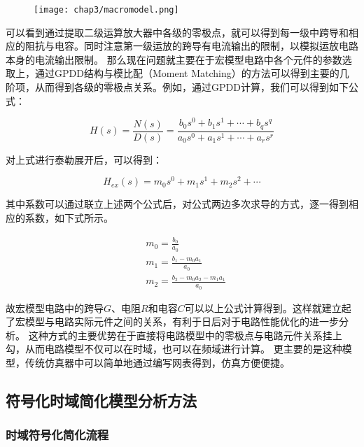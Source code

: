 \begin{figure}[!htp]
	\centering
	\texttt{[image: chap3/macromodel.png]}
\end{figure}

可以看到通过提取二级运算放大器中各级的零极点，就可以得到每一级中跨导和相应的阻抗与电容。同时注意第一级运放的跨导有电流输出的限制，以模拟运放电路本身的电流输出限制。
那么现在问题就主要在于宏模型电路中各个元件的参数选取上，通过GPDD结构与模比配（Moment Matching）的方法可以得到主要的几阶项，从而得到各级的零极点关系。例如，通过GPDD计算，我们可以得到如下公式：

\begin{equation}
H\left( s \right) = \frac{{N\left( s \right)}}
{{D\left( s \right)}} = \frac{{{b_0}{s^0} + {b_1}{s^1} +  \cdots  + {b_q}{s^q}}}
{{{a_0}{s^0} + {a_1}{s^1} +  \cdots  + {a_r}{s^r}}}
\end{equation}

对上式进行泰勒展开后，可以得到：

\begin{equation}
{H_{ex}}\left( s \right) = {m_0}{s^0} + {m_1}{s^1} + {m_2}{s^2} +  \cdots
\end{equation}

其中系数可以通过联立上述两个公式后，对公式两边多次求导的方式，逐一得到相应的系数，如下式所示。

\begin{align}
& m_0 = \frac{b_0}{a_0} \nonumber \\
& m_1 = \frac{{b_1} - {m_0}{a_1}}{a_0} \nonumber \\
& m_2 = \frac{{b_2} - {m_0}{a_2} - {m_1}{a_1}}{a_0} 
\end{align}

故宏模型电路中的跨导$G$、电阻$R$和电容$C$可以以上公式计算得到。这样就建立起了宏模型与电路实际元件之间的关系，有利于日后对于电路性能优化的进一步分析。
这种方式的主要优势在于直接将电路模型中的零极点与电路元件关系挂上勾，从而电路模型不仅可以在时域，也可以在频域进行计算。
更主要的是这种模型，传统仿真器中可以简单地通过编写网表得到，仿真方便便捷。

\subsection{符号化时域简化模型分析方法}

\subsubsection{时域符号化简化流程}

